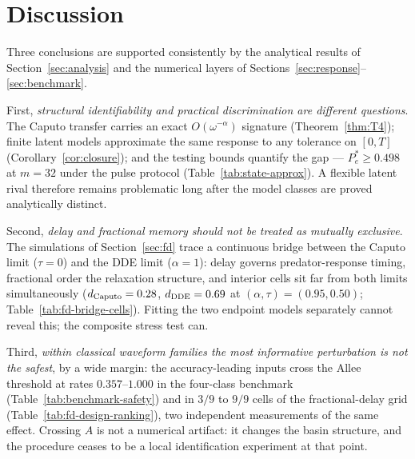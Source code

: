 \section{Discussion}
\label{sec:discussion}

Three conclusions are supported consistently by the analytical results of Section~\ref{sec:analysis} and the numerical layers of Sections~\ref{sec:response}--\ref{sec:benchmark}.

First, \emph{structural identifiability and practical discrimination are different questions}. The Caputo transfer carries an exact $O(\omega^{-\alpha})$ signature (Theorem~\ref{thm:T4}); finite latent models approximate the same response to any tolerance on $[0,T]$ (Corollary~\ref{cor:closure}); and the testing bounds quantify the gap --- $P_e^*\ge0.498$ at $m=32$ under the pulse protocol (Table~\ref{tab:state-approx}). A flexible latent rival therefore remains problematic long after the model classes are proved analytically distinct.

Second, \emph{delay and fractional memory should not be treated as mutually exclusive}. The simulations of Section~\ref{sec:fd} trace a continuous bridge between the Caputo limit ($\tau=0$) and the DDE limit ($\alpha=1$): delay governs predator-response timing, fractional order the relaxation structure, and interior cells sit far from both limits simultaneously ($d_{\rm Caputo}=0.28$, $d_{\rm DDE}=0.69$ at $(\alpha,\tau)=(0.95,0.50)$; Table~\ref{tab:fd-bridge-cells}). Fitting the two endpoint models separately cannot reveal this; the composite stress test can.

Third, \emph{within classical waveform families the most informative perturbation is not the safest}, by a wide margin: the accuracy-leading inputs cross the Allee threshold at rates $0.357$--$1.000$ in the four-class benchmark (Table~\ref{tab:benchmark-safety}) and in $3/9$ to $9/9$ cells of the fractional-delay grid (Table~\ref{tab:fd-design-ranking}), two independent measurements of the same effect. Crossing $A$ is not a numerical artifact: it changes the basin structure, and the procedure ceases to be a local identification experiment at that point.

